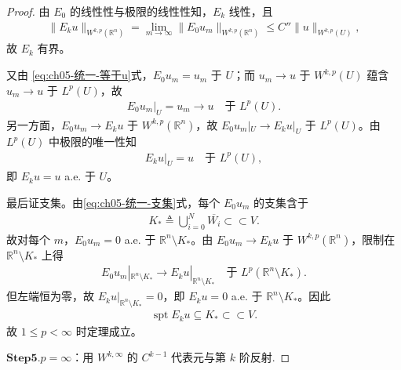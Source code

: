 \documentclass[../../main.tex]{subfiles}
\begin{document}
\begin{proof}
由 $E_0$ 的线性性与极限的线性性知，$E_k$ 线性，且
\begin{align*}
\|E_ku\|_{W^{k,p}(\mathbb{R}^{n})}
=\lim_{m\to\infty}\|E_0u_m\|_{W^{k,p}(\mathbb{R}^{n})}
\leqslant C''\|u\|_{W^{k,p}(U)},
\end{align*}
故 $E_k$ 有界。

又由 \eqref{eq:ch05-统一-等于u}式，$E_0u_m=u_m$ 于 $U$；而 $u_m\to u$ 于 $W^{k,p}(U)$ 蕴含 $u_m\to u$ 于 $L^{p}(U)$，故
\begin{align*}
E_0u_m|_{U}=u_m\longrightarrow u\quad\text{于 }L^{p}(U).
\end{align*}
另一方面，$E_0u_m\to E_ku$ 于 $W^{k,p}(\mathbb{R}^{n})$，故 $E_0u_m|_{U}\to E_ku|_{U}$ 于 $L^{p}(U)$。由 $L^{p}(U)$ 中极限的唯一性知
\begin{align*}
E_ku|_U=u\quad\text{于 }L^{p}(U),
\end{align*}
即 $E_ku=u$ a.e. 于 $U$。

最后证支集。由\eqref{eq:ch05-统一-支集}式，每个 $E_0u_m$ 的支集含于
\begin{align*}
K_*\triangleq\bigcup_{i=0}^{N}\overline{W_i}\subset\subset V.
\end{align*}
故对每个 $m$，$E_0u_m=0$ a.e. 于 $\mathbb{R}^{n}\setminus K_*$。由 $E_0u_m\to E_ku$ 于 $W^{k,p}(\mathbb{R}^{n})$，限制在 $\mathbb{R}^{n}\setminus K_*$ 上得
\begin{align*}
E_0u_m|_{\mathbb{R}^{n}\setminus K_*}\longrightarrow E_ku|_{\mathbb{R}^{n}\setminus K_*}\quad\text{于 }L^{p}(\mathbb{R}^{n}\setminus K_*).
\end{align*}
但左端恒为零，故 $E_ku|_{\mathbb{R}^{n}\setminus K_*}=0$，即 $E_ku=0$ a.e. 于 $\mathbb{R}^{n}\setminus K_*$。因此
\begin{align*}
\operatorname{spt}E_ku\subseteq K_*\subset\subset V.
\end{align*}
故 $1\leqslant p<\infty$ 时定理成立。

\noindent$\mathbf{Step}\bm{5}$.{\heiti $p=\infty$：用 $W^{k,\infty}$ 的 $C^{k-1}$ 代表元与第 $k$ 阶反射.}


\end{proof}
\end{document}
